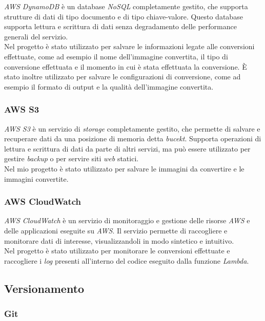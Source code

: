\emph{AWS DynamoDB} è un database \emph{NoSQL} completamente gestito, che
supporta strutture di dati di tipo documento e di tipo chiave-valore. Questo
database supporta lettura e scrittura di dati senza degradamento delle
performance generali del servizio. \\
Nel progetto è stato utilizzato per salvare le informazioni legate alle
conversioni effettuate, come ad esempio il nome dell'immagine convertita, il
tipo di conversione effettuata e il momento in cui è stata effettuata la
conversione. È stato inoltre utilizzato per salvare le configurazioni di
conversione, come ad esempio il formato di output e la qualità dell'immagine
convertita.

\subsubsection{AWS S3}

\emph{AWS S3} è un servizio di \emph{storage} completamente gestito, che
permette di salvare e recuperare dati da una posizione di memoria detta
\emph{bucekt}. Supporta operazioni di lettura e scrittura di dati da parte di
altri servizi, ma può essere utilizzato per gestire \emph{backup} o per servire
siti \emph{web} statici. \\
Nel mio progetto è stato utilizzato per salvare le immagini da convertire e le
immagini convertite.

\subsubsection{AWS CloudWatch}

\emph{AWS CloudWatch} è un servizio di monitoraggio e gestione delle risorse
\emph{AWS} e delle applicazioni eseguite su \emph{AWS}. Il servizio permette di
raccogliere e monitorare dati di interesse, visualizzandoli in modo sintetico e
intuitivo. \\
Nel progetto è stato utilizzato per monitorare le conversioni effettuate e
raccogliere i \emph{log} presenti all'interno del codice eseguito dalla funzione
\emph{Lambda}.

\subsection{Versionamento}

\subsubsection{Git}

